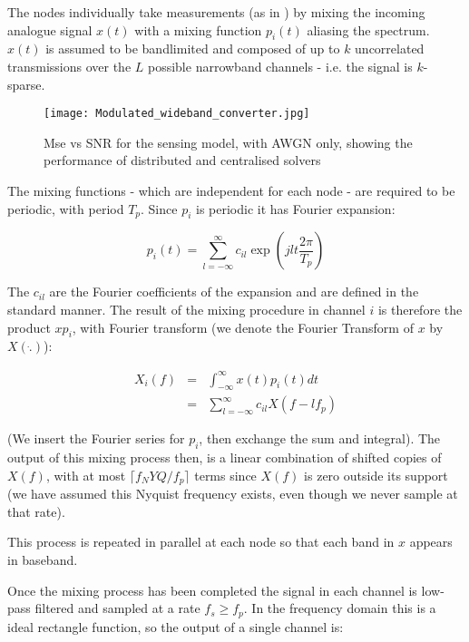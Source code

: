 The nodes individually take measurements (as in \cite{mishali2010theory}) by mixing the incoming analogue signal \(x\left(t\right)\) with a mixing function \(p_i\left(t\right)\) aliasing the spectrum. \(x\left(t\right)\) is assumed to be bandlimited and composed of up to \(k\) uncorrelated transmissions over the \(L\) possible narrowband channels - i.e. the signal is \(k\)-sparse. 

\begin{figure}[h]
\centering
\texttt{[image: Modulated\_wideband\_converter.jpg]}
\caption{Mse vs SNR for the sensing model, with AWGN only, showing the performance of distributed and centralised solvers}
\label{msevssnr0}
\end{figure}

The mixing functions - which are independent for each node - are required to be periodic, with period \(T_p\). Since \(p_i\) is periodic it has Fourier expansion:

\begin{equation}
p_i\left(t\right) = \sum_{l=-\infty}^{\infty} c_{il} \exp\left({jlt\frac{2\pi}{T_p}}\right)
\end{equation}

The \(c_{il}\) are the Fourier coefficients of the expansion and are defined in the standard manner. The result of the mixing procedure in channel \(i\) is therefore the product \(xp_i\), with Fourier transform (we denote the Fourier Transform of \(x\) by \(X\left( \dot{.} \right)\)):

\begin{align}
X_{i}\left(f\right) &=& \int_{-\infty}^{\infty} x\left(t\right) p_i\left(t\right) dt \nonumber
\\ &=& \sum_{l=-\infty}^{\infty} c_{il} X\left(f-lf_p\right)
\end{align}

(We insert the Fourier series for \(p_i\), then exchange the sum and integral). The output of this mixing process then, is a linear combination of shifted copies of \(X\left(f\right)\), with at most \(\lceil f_NYQ/f_p\rceil\) terms since \(X\left(f\right)\) is zero outside its support (we have assumed this Nyquist frequency exists, even though we never sample at that rate).

This process is repeated in parallel at each node so that each band in \(x\) appears in baseband.

Once the mixing process has been completed the signal in each channel is low-pass filtered and sampled at a rate \(f_s \geq f_p\). In the frequency domain this is a ideal rectangle function, so the output of a single channel is:

